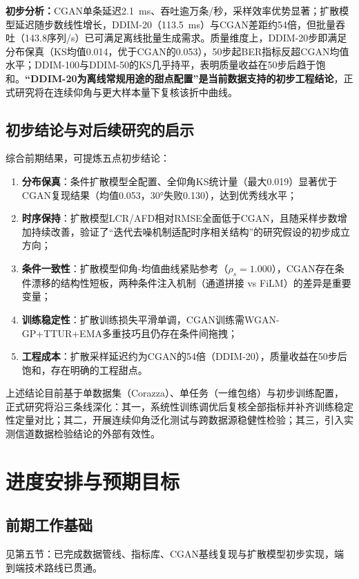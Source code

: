 \documentclass[12pt, a4paper]{ctexart}
\begin{document}
\textbf{初步分析：}CGAN单条延迟2.1~ms、吞吐逾万条/秒，采样效率优势显著；扩散模型延迟随步数线性增长，DDIM-20（113.5~ms）与CGAN差距约54倍，但批量吞吐（143.8序列/s）已可满足离线批量生成需求。质量维度上，DDIM-20步即满足分布保真（KS均值0.014，优于CGAN的0.053），50步起BER指标反超CGAN均值水平；DDIM-100与DDIM-50的KS几乎持平，表明质量收益在50步后趋于饱和。\textbf{“DDIM-20为离线常规用途的甜点配置”是当前数据支持的初步工程结论}，正式研究将在连续仰角与更大样本量下复核该折中曲线。

\subsection{初步结论与对后续研究的启示}
综合前期结果，可提炼五点初步结论：
\begin{enumerate}
\item \textbf{分布保真}：条件扩散模型全配置、全仰角KS统计量（最大0.019）显著优于CGAN复现结果（均值0.053，30°失败0.130），达到优秀线水平；
\item \textbf{时序保持}：扩散模型LCR/AFD相对RMSE全面低于CGAN，且随采样步数增加持续改善，验证了“迭代去噪机制适配时序相关结构”的研究假设的初步成立方向；
\item \textbf{条件一致性}：扩散模型仰角-均值曲线紧贴参考（$\rho_s=1.000$），CGAN存在条件漂移的结构性短板，两种条件注入机制（通道拼接 vs FiLM）的差异是重要变量；
\item \textbf{训练稳定性}：扩散训练损失平滑单调，CGAN训练需WGAN-GP+TTUR+EMA多重技巧且仍存在条件间拖拽；
\item \textbf{工程成本}：扩散采样延迟约为CGAN的54倍（DDIM-20），质量收益在50步后饱和，存在明确的工程甜点。
\end{enumerate}
上述结论目前基于单数据集（Corazza）、单任务（一维包络）与初步训练配置，正式研究将沿三条线深化：其一，系统性训练调优后复核全部指标并补齐训练稳定性定量对比；其二，开展连续仰角泛化测试与跨数据源稳健性检验；其三，引入实测信道数据检验结论的外部有效性。

\section{进度安排与预期目标}

\subsection{前期工作基础}
见第五节：已完成数据管线、指标库、CGAN基线复现与扩散模型初步实现，端到端技术路线已贯通。
\end{document}
